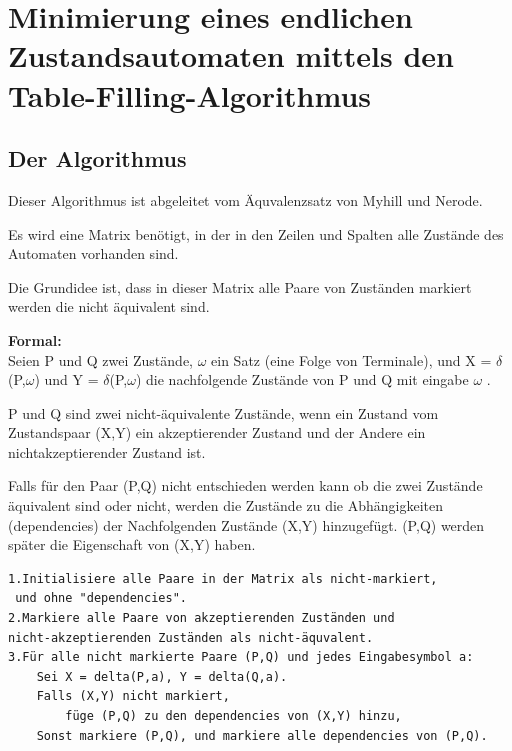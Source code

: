 \section{Minimierung eines endlichen Zustandsautomaten mittels den
Table-Filling-Algorithmus}

\subsection{Der Algorithmus}
\cite{minimization1,minimization2,minimization3}
Dieser Algorithmus ist abgeleitet vom Äquvalenzsatz von Myhill und Nerode. 

Es wird eine Matrix benötigt, in der in den Zeilen und Spalten alle Zustände des
Automaten vorhanden sind.

Die Grundidee ist, dass in dieser Matrix alle Paare von Zuständen markiert
werden die nicht äquivalent sind.

{\bf Formal: \\}
Seien P und Q zwei Zustände, $\omega$ ein Satz (eine Folge von Terminale), und X
= $\delta$(P,$\omega$) und Y = $\delta$(P,$\omega$) die nachfolgende Zustände von P und Q mit eingabe
$\omega$ .

P und Q sind zwei nicht-äquivalente Zustände, wenn ein Zustand vom
Zustandspaar (X,Y) ein akzeptierender Zustand und der Andere ein
nichtakzeptierender Zustand ist.

Falls für den Paar (P,Q) nicht entschieden werden kann ob die zwei Zustände
äquivalent sind oder nicht, werden die Zustände zu die Abhängigkeiten
(dependencies) der Nachfolgenden Zustände (X,Y) hinzugefügt. (P,Q) werden
später die Eigenschaft von (X,Y) haben.

\lstset{language=C, basicstyle=\footnotesize}
\begin{lstlisting}[float=h!, frame=tb, captionpos=b,
caption={Table-Filling-Algorithmus : Pseudocode}, label=list:TablefillingCode]
1.Initialisiere alle Paare in der Matrix als nicht-markiert,
 und ohne "dependencies".
2.Markiere alle Paare von akzeptierenden Zuständen und 
nicht-akzeptierenden Zuständen als nicht-äquvalent.
3.Für alle nicht markierte Paare (P,Q) und jedes Eingabesymbol a:
	Sei X = delta(P,a), Y = delta(Q,a).
	Falls (X,Y) nicht markiert, 
		füge (P,Q) zu den dependencies von (X,Y) hinzu,
	Sonst markiere (P,Q), und markiere alle dependencies von (P,Q).
	
\end{lstlisting}

